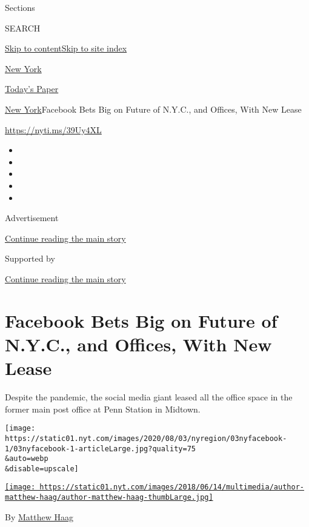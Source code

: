 Sections

SEARCH

\protect\hyperlink{site-content}{Skip to
content}\protect\hyperlink{site-index}{Skip to site index}

\href{https://www.nytimes.com/section/nyregion}{New York}

\href{https://myaccount.nytimes.com/auth/login?response_type=cookie\&client_id=vi}{}

\href{https://www.nytimes.com/section/todayspaper}{Today's Paper}

\href{/section/nyregion}{New York}\textbar{}Facebook Bets Big on Future
of N.Y.C., and Offices, With New Lease

\url{https://nyti.ms/39Uy4XL}

\begin{itemize}
\item
\item
\item
\item
\item
\end{itemize}

Advertisement

\protect\hyperlink{after-top}{Continue reading the main story}

Supported by

\protect\hyperlink{after-sponsor}{Continue reading the main story}

\hypertarget{facebook-bets-big-on-future-of-nyc-and-offices-with-new-lease}{%
\section{Facebook Bets Big on Future of N.Y.C., and Offices, With New
Lease}\label{facebook-bets-big-on-future-of-nyc-and-offices-with-new-lease}}

Despite the pandemic, the social media giant leased all the office space
in the former main post office at Penn Station in Midtown.

\texttt{[image: https://static01.nyt.com/images/2020/08/03/nyregion/03nyfacebook-1/03nyfacebook-1-articleLarge.jpg?quality=75\\\&auto=webp\\\&disable=upscale]}

\href{https://www.nytimes.com/by/matthew-haag}{\texttt{[image: https://static01.nyt.com/images/2018/06/14/multimedia/author-matthew-haag/author-matthew-haag-thumbLarge.jpg]}}

By \href{https://www.nytimes.com/by/matthew-haag}{Matthew Haag}

